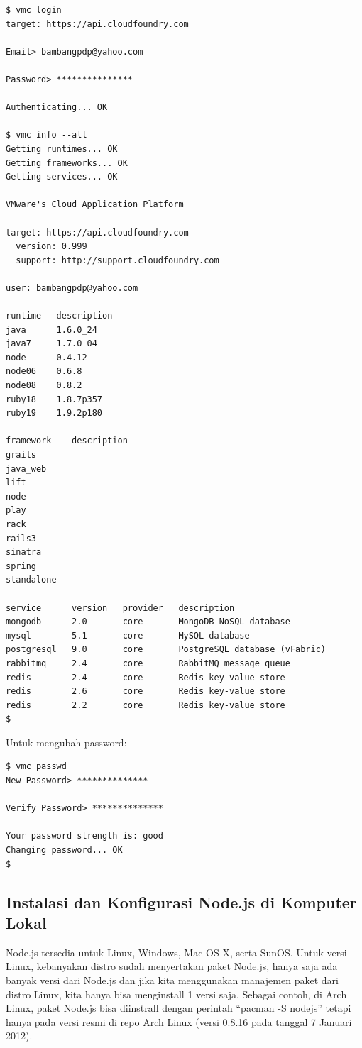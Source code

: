\lstset{language=bash,caption=Login ke server}
\begin{lstlisting}
$ vmc login 
target: https://api.cloudfoundry.com

Email> bambangpdp@yahoo.com

Password> ***************

Authenticating... OK

$ vmc info --all
Getting runtimes... OK
Getting frameworks... OK
Getting services... OK

VMware's Cloud Application Platform

target: https://api.cloudfoundry.com
  version: 0.999
  support: http://support.cloudfoundry.com

user: bambangpdp@yahoo.com

runtime   description
java      1.6.0_24   
java7     1.7.0_04   
node      0.4.12     
node06    0.6.8      
node08    0.8.2      
ruby18    1.8.7p357  
ruby19    1.9.2p180  

framework    description
grails       
java_web     
lift         
node         
play         
rack         
rails3       
sinatra      
spring       
standalone   

service      version   provider   description                  
mongodb      2.0       core       MongoDB NoSQL database       
mysql        5.1       core       MySQL database               
postgresql   9.0       core       PostgreSQL database (vFabric)
rabbitmq     2.4       core       RabbitMQ message queue       
redis        2.4       core       Redis key-value store        
redis        2.6       core       Redis key-value store        
redis        2.2       core       Redis key-value store 
$ 
\end{lstlisting}

Untuk mengubah password:

\lstset{language=bash,caption=Mengubah password server}
\begin{lstlisting}
$ vmc passwd 
New Password> **************

Verify Password> **************

Your password strength is: good
Changing password... OK
$
\end{lstlisting}

\subsection{Instalasi dan Konfigurasi Node.js di Komputer Lokal}

Node.js tersedia untuk Linux, Windows, Mac OS X, serta SunOS. Untuk versi Linux, kebanyakan distro sudah menyertakan paket Node.js, hanya saja ada banyak versi dari Node.js dan jika kita menggunakan manajemen paket dari distro Linux, kita hanya bisa menginstall 1 versi saja. Sebagai contoh, di Arch Linux, paket Node.js bisa diinstrall dengan perintah ``pacman -S nodejs'' tetapi hanya pada versi resmi di repo Arch Linux (versi 0.8.16 pada tanggal 7 Januari 2012). 

